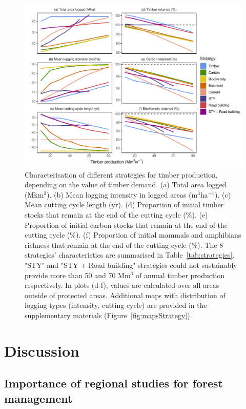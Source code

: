 \documentclass{article}
\begin{document}
\begin{figure}
    \centering
    \includegraphics[width=\linewidth]{graphs/increasingDemand.pdf}
    \caption{Characterisation of different strategies for timber production, depending on the value of timber demand. (a) Total area logged (Mkm$^2$). (b) Mean logging intensity in logged areas (m$^3$ha$^{-1}$). (c) Mean cutting cycle length (yr). (d) Proportion of initial timber stocks that remain at the end of the cutting cycle (\%). (e) Proportion of initial carbon stocks that remain at the end of the cutting cycle (\%). (f) Proportion of initial mammals and amphibians richness that remain at the end of the cutting cycle (\%). The 8 strategies' characteristics are summarised in Table~\ref{tab:strategies}. "STY" and "STY + Road building" strategies could not sustainably provide more than 50 and 70 Mm$^3$ of annual timber production respectively. In plots (d-f), values are calculated over all areas outside of protected areas. Additional maps with distribution of logging types (intensity, cutting cycle) are provided in the supplementary materials (Figure~\ref{fig:mapsStrategy}).}
    \label{fig:incDemand}
\end{figure}

\section{Discussion}

\subsection{Importance of regional studies for forest management}
\end{document}
